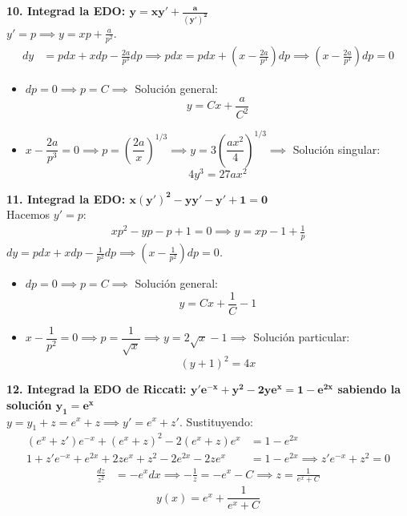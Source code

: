\documentclass[11pt, a4paper]{article}
\begin{document}
\noindent\textbf{10. Integrad la EDO: $\bm{y = xy' + \frac{a}{(y')^2}}$} \\
$y' = p \implies y = xp + \frac{a}{p^2}$.
\begin{align*}
dy &= pdx + xdp - \frac{2a}{p^3}dp \implies pdx = pdx + \left(x - \frac{2a}{p^3}\right)dp \implies \left(x - \frac{2a}{p^3}\right)dp = 0
\end{align*}
\begin{itemize}
\item $dp = 0 \implies p = C \implies$ Solución general:
\[
\boxed{y = Cx + \frac{a}{C^2}}
\]
\item $x - \dfrac{2a}{p^3} = 0 \implies p = \left(\dfrac{2a}{x}\right)^{1/3} \implies y = 3\left(\dfrac{ax^2}{4}\right)^{1/3} \implies$ Solución singular:
\[
\boxed{4y^3 = 27ax^2}
\]
\end{itemize}


\noindent\textbf{11. Integrad la EDO: $\bm{x(y')^2 - yy' - y' + 1 = 0}$} \\
Hacemos $y' = p$:
\begin{align*}
xp^2 - yp - p + 1 = 0 \implies y = xp - 1 + \frac{1}{p}
\end{align*}
\textit{$dy = pdx + xdp - \frac{1}{p^2}dp \implies \left(x - \frac{1}{p^2}\right)dp = 0$.}
\begin{itemize}
\item $dp = 0 \implies p = C \implies$ Solución general:
\[
\boxed{y = Cx + \frac{1}{C} - 1}
\]
\item $x - \dfrac{1}{p^2} = 0 \implies p = \dfrac{1}{\sqrt{x}} \implies y = 2\sqrt{x} - 1 \implies$ Solución particular:
\[
\boxed{(y+1)^2 = 4x}
\]
\end{itemize}


\noindent\textbf{12. Integrad la EDO de Riccati: $\bm{y'e^{-x} + y^2 - 2ye^x = 1 - e^{2x}}$ sabiendo la solución $\bm{y_1 = e^x}$} \\
$y = y_1 + z = e^x + z \implies y' = e^x + z'$. Sustituyendo:
\begin{align*}
(e^x + z')e^{-x} + (e^x+z)^2 - 2(e^x+z)e^x &= 1 - e^{2x} \\
1 + z'e^{-x} + e^{2x} + 2ze^x + z^2 - 2e^{2x} - 2ze^x &= 1 - e^{2x} \implies z'e^{-x} + z^2 = 0
\end{align*}
\begin{align*}
\frac{dz}{z^2} &= -e^x dx \implies -\frac{1}{z} = -e^x - C \implies z = \frac{1}{e^x + C}
\end{align*}
\[
\boxed{y(x) = e^x + \frac{1}{e^x + C}}
\]
\end{document}
